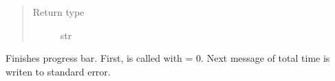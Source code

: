 \documentclass[a4paper,10pt,english]{sphinxmanual}
\begin{document}
\begin{fulllineitems}
\begin{fulllineitems}
\begin{quote}
\begin{description}
\item[{Return type}] \leavevmode
str

\end{description}\end{quote}

\end{fulllineitems}


\begin{fulllineitems}
\label{aqueduct.utils.log:aqueduct.utils.log.SimpleProgressBar.finish}
Finishes progress bar. First, {\hyperref[aqueduct.utils.log:aqueduct.utils.log.SimpleProgressBar.update]{}} is called with  = 0. Next message of total time
is writen to standard error.

\end{fulllineitems}


\end{fulllineitems}

\end{document}

